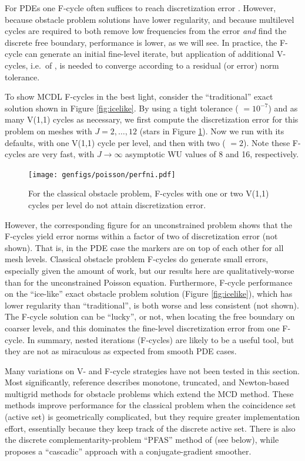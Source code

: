 \documentclass[letterpaper,final,12pt,reqno]{amsart}
\theoremstyle{claim}
\numberwithin{equation}{section}
\numberwithin{figure}{section}
\numberwithin{table}{section}
\numberwithin{theorem}{section}
\begin{document}
For PDEs one F-cycle often suffices to reach discretization error \cite{Trottenbergetal2001}.  However, because obstacle problem solutions have lower regularity, and because multilevel cycles are required to both remove low frequencies from the error \emph{and} find the discrete free boundary, performance is lower, as we will see.  In practice, the F-cycle can generate an initial fine-level iterate, but application of additional V-cycles, i.e.~of , is needed to converge according to a residual (or error) norm tolerance.

To show MCDL F-cycles in the best light, consider the ``traditional'' exact solution shown in Figure \ref{fig:icelike}.  By using a tight tolerance ( $=10^{-7}$) and as many V(1,1) cycles as necessary, we first compute the discretization error for this problem on meshes with $J=2,\dots,12$ (stars in Figure \ref{fig:perfni}).  Now we run  with its defaults, with one V(1,1) cycle per level, and then with two ( $=2$).  Note these F-cycles are very fast, with $J\to\infty$ asymptotic WU values of 8 and 16, respectively.

\begin{figure}
\texttt{[image: genfigs/poisson/perfni.pdf]}
\caption{For the classical obstacle problem, F-cycles with one or two V(1,1) cycles per level do not attain discretization error.}
\label{fig:perfni}
\end{figure}

However, the corresponding figure for an unconstrained problem shows that the F-cycles yield error norms within a factor of two of discretization error (not shown).  That is, in the PDE case the markers are on top of each other for all mesh levels.  Classical obstacle problem F-cycles do generate small errors, especially given the amount of work, but our results here are qualitatively-worse than for the unconstrained Poisson equation.  Furthermore, F-cycle performance on the ``ice-like'' exact obstacle problem solution (Figure \ref{fig:icelike}), which has lower regularity than ``traditional'', is both worse and less consistent (not shown).  The F-cycle solution can be ``lucky'', or not, when locating the free boundary on coarser levels, and this dominates the fine-level discretization error from one F-cycle.  In summary, nested iterations (F-cycles) are likely to be a useful tool, but they are not as miraculous as expected from smooth PDE cases.

Many variations on V- and F-cycle strategies have not been tested in this section.  Most significantly, reference \cite{GraeserKornhuber2009} describes monotone, truncated, and Newton-based multigrid methods for obstacle problems which extend the MCD method.  These methods improve performance for the classical problem when the coincidence set (active set) is geometrically complicated, but they require greater implementation effort, essentially because they keep track of the discrete active set.  There is also the discrete complementarity-problem ``PFAS'' method of \cite{BrandtCryer1983} (see below), while \cite{Blumetal2004} proposes a ``cascadic'' approach with a conjugate-gradient smoother.
\end{document}
